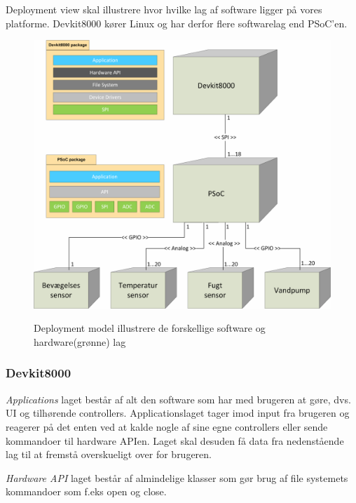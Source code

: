 
Deployment view skal illustrere hvor hvilke lag af software ligger på vores platforme. Devkit8000 kører Linux og har derfor flere softwarelag end PSoC'en.
 
\vspace{15 mm}

\begin{figure}[htbp] \centering
{\includegraphics[scale=0.7]{filer/systemarkitektur/Deployment_model}}
\caption{Deployment model illustrere de forskellige software og hardware(grønne) lag}
\label{fig:Deployment Model}
\end{figure}

\vspace{5 mm}

\subsubsection{Devkit8000}
\textit{Applications} laget består af alt den software som har med brugeren at gøre, dvs. UI og tilhørende controllers. Applicationslaget tager imod input fra brugeren og reagerer på det enten ved at kalde nogle af sine egne controllers eller sende kommandoer til hardware APIen. Laget skal desuden få data fra nedenstående lag til at fremstå overskueligt over for brugeren.

\clearpage

\textit{Hardware API} laget består af almindelige klasser som gør brug af file systemets kommandoer som f.eks open og close.

